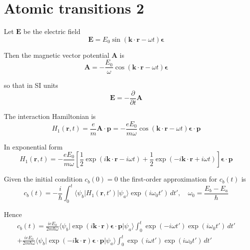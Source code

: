 

\section*{Atomic transitions 2}

Let $\mathbf E$ be the electric field
\begin{equation*}
\mathbf E=E_0\sin(\mathbf k\cdot\mathbf r-\omega t)\boldsymbol{\epsilon}
\end{equation*}

Then the magnetic vector potential $\mathbf A$ is
\begin{equation*}
\mathbf A=-\frac{E_0}{\omega}\cos(\mathbf k\cdot\mathbf r-\omega t)\boldsymbol{\epsilon}
\end{equation*}

so that in SI units%
\begin{equation*}
\mathbf E=-\frac{\partial}{\partial t}\mathbf A
\end{equation*}

The interaction Hamiltonian is
\begin{equation*}
H_1(\mathbf r,t)=\frac{e}{m}\mathbf A\cdot\mathbf p=-\frac{eE_0}{m\omega}
\cos(\mathbf k\cdot\mathbf r-\omega t)
\boldsymbol{\epsilon}\cdot\mathbf p
\end{equation*}

In exponential form
\begin{equation*}
H_1(\mathbf r,t)=-\frac{eE_0}{m\omega}
\left[\frac{1}{2}\exp(i\mathbf k\cdot\mathbf r-i\omega t)
+\frac{1}{2}\exp(-i\mathbf k\cdot\mathbf r+i\omega t)\right]
\boldsymbol{\epsilon}\cdot\mathbf p
\end{equation*}

Given the initial condition $c_b(0)=0$ the first-order approximation for $c_b(t)$ is
\begin{equation*}
c_b(t)=-\frac{i}{\hbar}\int_0^t
\langle\psi_b|H_1(\mathbf r,t')|\psi_a\rangle\exp(i\omega_0t')\,dt',\quad
\omega_0=\frac{E_b-E_a}{\hbar}
\end{equation*}

Hence
\begin{multline*}
c_b(t)
=\frac{ieE_0}{2m\hbar\omega}
\langle\psi_b|\exp(i\mathbf k\cdot\mathbf r)\boldsymbol{\epsilon}\cdot\mathbf p|\psi_a\rangle
\int_0^t\exp(-i\omega t')\exp(i\omega_0t')\,dt'
\\
+\frac{ieE_0}{2m\hbar\omega}
\langle\psi_b|\exp(-i\mathbf k\cdot\mathbf r)\boldsymbol{\epsilon}\cdot\mathbf p|\psi_a\rangle
\int_0^t\exp(i\omega t')\exp(i\omega_0t')\,dt'
\end{multline*}

